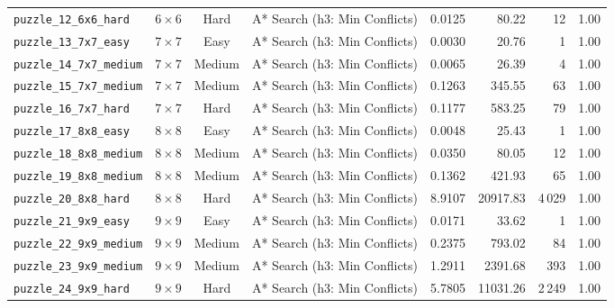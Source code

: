 \documentclass{article}
\begin{document}
\begin{longtable}{@{}lccl r r r c@{}}
  \texttt{puzzle\_12\_6x6\_hard} & $6\times6$ & Hard & A* Search (h3: Min Conflicts) & 0.0125 & 80.22 & 12 & 1.00 \\
  \texttt{puzzle\_13\_7x7\_easy} & $7\times7$ & Easy & A* Search (h3: Min Conflicts) & 0.0030 & 20.76 & 1 & 1.00 \\
  \texttt{puzzle\_14\_7x7\_medium} & $7\times7$ & Medium & A* Search (h3: Min Conflicts) & 0.0065 & 26.39 & 4 & 1.00 \\
  \texttt{puzzle\_15\_7x7\_medium} & $7\times7$ & Medium & A* Search (h3: Min Conflicts) & 0.1263 & 345.55 & 63 & 1.00 \\
  \texttt{puzzle\_16\_7x7\_hard} & $7\times7$ & Hard & A* Search (h3: Min Conflicts) & 0.1177 & 583.25 & 79 & 1.00 \\
  \texttt{puzzle\_17\_8x8\_easy} & $8\times8$ & Easy & A* Search (h3: Min Conflicts) & 0.0048 & 25.43 & 1 & 1.00 \\
  \texttt{puzzle\_18\_8x8\_medium} & $8\times8$ & Medium & A* Search (h3: Min Conflicts) & 0.0350 & 80.05 & 12 & 1.00 \\
  \texttt{puzzle\_19\_8x8\_medium} & $8\times8$ & Medium & A* Search (h3: Min Conflicts) & 0.1362 & 421.93 & 65 & 1.00 \\
  \texttt{puzzle\_20\_8x8\_hard} & $8\times8$ & Hard & A* Search (h3: Min Conflicts) & 8.9107 & 20917.83 & 4\,029 & 1.00 \\
  \texttt{puzzle\_21\_9x9\_easy} & $9\times9$ & Easy & A* Search (h3: Min Conflicts) & 0.0171 & 33.62 & 1 & 1.00 \\
  \texttt{puzzle\_22\_9x9\_medium} & $9\times9$ & Medium & A* Search (h3: Min Conflicts) & 0.2375 & 793.02 & 84 & 1.00 \\
  \texttt{puzzle\_23\_9x9\_medium} & $9\times9$ & Medium & A* Search (h3: Min Conflicts) & 1.2911 & 2391.68 & 393 & 1.00 \\
  \texttt{puzzle\_24\_9x9\_hard} & $9\times9$ & Hard & A* Search (h3: Min Conflicts) & 5.7805 & 11031.26 & 2\,249 & 1.00 \\
\end{longtable}
\end{document}
